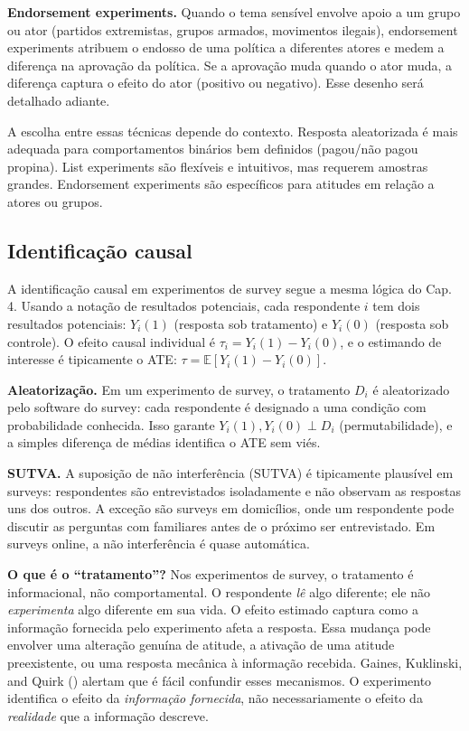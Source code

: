 \documentclass[
]{article}
\begin{document}
\textbf{Endorsement experiments.} Quando o tema sensível envolve apoio a um grupo ou ator (partidos extremistas, grupos armados, movimentos ilegais), endorsement experiments atribuem o endosso de uma política a diferentes atores e medem a diferença na aprovação da política. Se a aprovação muda quando o ator muda, a diferença captura o efeito do ator (positivo ou negativo). Esse desenho será detalhado adiante.

A escolha entre essas técnicas depende do contexto. Resposta aleatorizada é mais adequada para comportamentos binários bem definidos (pagou/não pagou propina). List experiments são flexíveis e intuitivos, mas requerem amostras grandes. Endorsement experiments são específicos para atitudes em relação a atores ou grupos.

\subsection{Identificação causal}\label{identificauxe7uxe3o-causal}

A identificação causal em experimentos de survey segue a mesma lógica do Cap. 4. Usando a notação de resultados potenciais, cada respondente \(i\) tem dois resultados potenciais: \(Y_i(1)\) (resposta sob tratamento) e \(Y_i(0)\) (resposta sob controle). O efeito causal individual é \(\tau_i = Y_i(1) - Y_i(0)\), e o estimando de interesse é tipicamente o ATE: \(\tau = \mathbb{E}[Y_i(1) - Y_i(0)]\).

\textbf{Aleatorização.} Em um experimento de survey, o tratamento \(D_i\) é aleatorizado pelo software do survey: cada respondente é designado a uma condição com probabilidade conhecida. Isso garante \(Y_i(1), Y_i(0) \perp D_i\) (permutabilidade), e a simples diferença de médias identifica o ATE sem viés.

\textbf{SUTVA.} A suposição de não interferência (SUTVA) é tipicamente plausível em surveys: respondentes são entrevistados isoladamente e não observam as respostas uns dos outros. A exceção são surveys em domicílios, onde um respondente pode discutir as perguntas com familiares antes de o próximo ser entrevistado. Em surveys online, a não interferência é quase automática.

\textbf{O que é o ``tratamento''?} Nos experimentos de survey, o tratamento é informacional, não comportamental. O respondente \emph{lê} algo diferente; ele não \emph{experimenta} algo diferente em sua vida. O efeito estimado captura como a informação fornecida pelo experimento afeta a resposta. Essa mudança pode envolver uma alteração genuína de atitude, a ativação de uma atitude preexistente, ou uma resposta mecânica à informação recebida. Gaines, Kuklinski, and Quirk () alertam que é fácil confundir esses mecanismos. O experimento identifica o efeito da \emph{informação fornecida}, não necessariamente o efeito da \emph{realidade} que a informação descreve.
\end{document}
